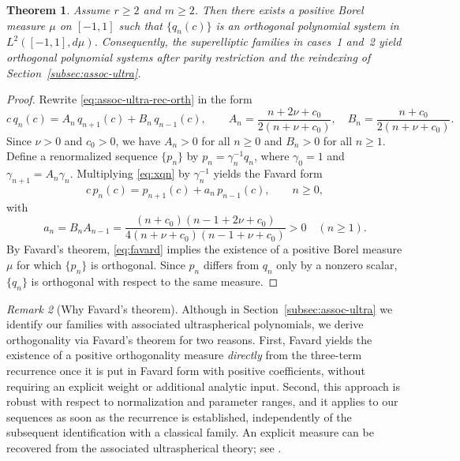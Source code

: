 \documentclass[final,nopreprintline]{elsarticle}
\newtheorem{theorem}{Theorem}[section]
\theoremstyle{definition}
\numberwithin{equation}{section}
\theoremstyle{remark}
\newtheorem{remark}[theorem]{Remark}
\begin{document}
\begin{theorem}\label{thm:orthogonality}
Assume $r\ge2$ and $m\ge2$. Then there exists a positive Borel measure $\mu$ on $[-1,1]$
such that $\{q_n(c)\}$ is an orthogonal polynomial system in $L^2([-1,1],d\mu)$.
Consequently, the superelliptic families in cases~1 and~2 yield orthogonal polynomial
systems after parity restriction and the reindexing of Section~\ref{subsec:assoc-ultra}.
\end{theorem}

\begin{proof}
Rewrite \eqref{eq:assoc-ultra-rec-orth} in the form
\begin{equation}\label{eq:xqn}
c\,q_n(c)=A_n\,q_{n+1}(c)+B_n\,q_{n-1}(c),
\qquad
A_n=\frac{n+2\nu+c_0}{2(n+\nu+c_0)},\quad
B_n=\frac{n+c_0}{2(n+\nu+c_0)}.
\end{equation}
Since $\nu>0$ and $c_0>0$, we have $A_n>0$ for all $n\ge0$ and $B_n>0$ for all $n\ge1$.
Define a renormalized sequence $\{p_n\}$ by $p_n=\gamma_n^{-1}q_n$, where $\gamma_0=1$ and
$\gamma_{n+1}=A_n\gamma_n$. Multiplying \eqref{eq:xqn} by $\gamma_n^{-1}$ yields the
Favard form
\begin{equation}\label{eq:favard}
c\,p_n(c)=p_{n+1}(c)+a_n\,p_{n-1}(c),\qquad n\ge0,
\end{equation}
with
\[
a_n=B_nA_{n-1}=\frac{(n+c_0)(n-1+2\nu+c_0)}{4(n+\nu+c_0)(n-1+\nu+c_0)}>0\quad(n\ge1).
\]
By Favard's theorem, \eqref{eq:favard} implies the existence of a positive Borel measure
$\mu$ for which $\{p_n\}$ is orthogonal. Since $p_n$ differs from $q_n$ only by a nonzero
scalar, $\{q_n\}$ is orthogonal with respect to the same measure.
\end{proof}

\begin{remark}[Why Favard's theorem]\label{rem:favard}
Although in Section~\ref{subsec:assoc-ultra} we identify our families with associated
ultraspherical polynomials, we derive orthogonality via Favard's theorem for two reasons.
First, Favard yields the existence of a positive orthogonality measure \emph{directly}
from the three-term recurrence once it is put in Favard form with positive coefficients,
without requiring an explicit weight or additional analytic input. Second, this approach
is robust with respect to normalization and parameter ranges, and it applies to our
sequences as soon as the recurrence is established, independently of the subsequent
identification with a classical family. An explicit measure can be recovered from the
associated ultraspherical theory; see \cite{BustozIsmail1982}.
\end{remark}
\end{document}
